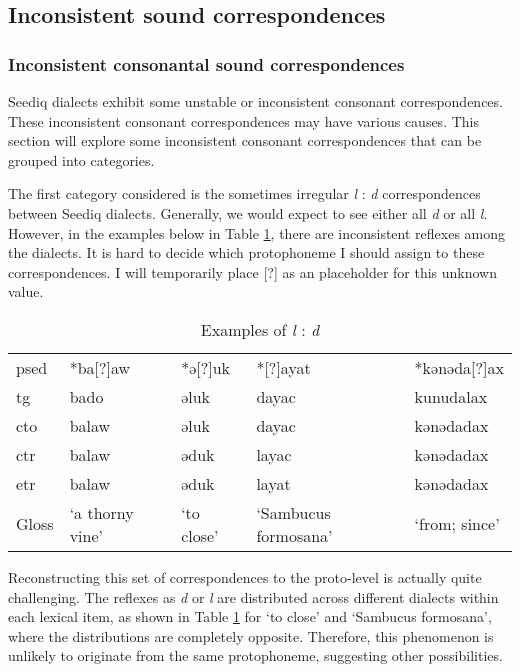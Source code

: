 \subsection{Inconsistent sound correspondences}

\subsubsection{Inconsistent consonantal sound correspondences}

Seediq dialects exhibit some unstable or inconsistent consonant correspondences. These inconsistent consonant correspondences may have various causes. This section will explore some inconsistent consonant correspondences that can be grouped into categories.


The first category considered is the sometimes irregular \textit{l} : \textit{d} correspondences between Seediq dialects. Generally, we would expect to see either all \textit{d} or all \textit{l}. However, in the examples below in Table \ref{tab:irr_ld}, there are inconsistent reflexes among the dialects. It is hard to decide which protophoneme I should assign to these correspondences. I will temporarily place [?] as an placeholder for this unknown value.

\begin{table}[!htbp]
\centering
\caption{Examples of \textit{l} : \textit{d}}
\label{tab:irr_ld}
\begin{tabular}{lllll}
\hline
\acs{psed} & *ba[?]aw        & *ə[?]uk    & *[?]ayat             & *kənəda[?]ax    \\ \hdashline
\acs{tg}   & bado            & əluk       & dayac                & kunudalax     \\
\acs{cto}  & balaw           & əluk       & dayac                & kənədadax     \\
\acs{ctr}  & balaw           & əduk       & layac                & kənədadax     \\
\acs{etr}  & balaw           & əduk       & layat                & kənədadax     \\ \hline
Gloss      & `a thorny vine' & `to close' & `Sambucus formosana' & `from; since' \\ \hline
\end{tabular}
\end{table}

Reconstructing this set of correspondences to the proto-level is actually quite challenging. The reflexes as \textit{d} or \textit{l} are distributed across different dialects within each lexical item, as shown in Table \ref{tab:irr_ld} for `to close' and `Sambucus formosana', where the distributions are completely opposite. Therefore, this phenomenon is unlikely to originate from the same protophoneme, suggesting other possibilities.


